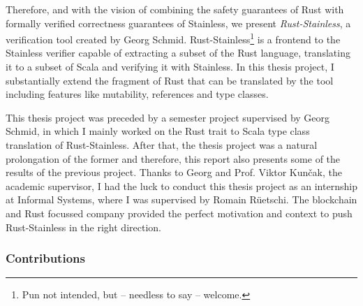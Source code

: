 Therefore, and with the vision of combining the safety guarantees of Rust with
formally verified correctness guarantees of Stainless, we present
\emph{Rust-Stainless}, a verification tool created by Georg Schmid.
Rust-Stainless\footnote{Pun not intended, but -- needless to say -- welcome.} is
a frontend to the Stainless verifier capable of extracting a subset of the Rust
language, translating it to a subset of Scala and verifying it with Stainless.
In this thesis project, I substantially extend the fragment of Rust that can be
translated by the tool including features like mutability, references and type
classes.
\newpage

This thesis project was preceded by a semester project supervised by Georg
Schmid, in which I  mainly worked on the Rust trait to Scala type class
translation of Rust-Stainless. After that, the thesis project was a natural
prolongation of the former and therefore, this report also presents some of the
results of the previous project. Thanks to Georg and Prof. Viktor Kun\v{c}ak,
the academic supervisor, I had the luck to conduct this thesis project as an
internship at Informal Systems, where I was supervised by Romain Rüetschi. The
blockchain and Rust focussed company provided the perfect motivation and
context to push Rust-Stainless in the right direction.

\subsubsection{Contributions}

